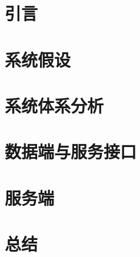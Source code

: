 \documentclass[12pt,hyperref,a4paper,UTF8]{ctexart}
\begin{document}
\cover

%
%

\thispagestyle{empty} %

\newpage
\tableofcontents

\newpage


\section{引言}

\section{系统假设}

\section{系统体系分析}

\section{数据端与服务接口}

\section{服务端}

\section{总结}

\newpage


\end{document}
